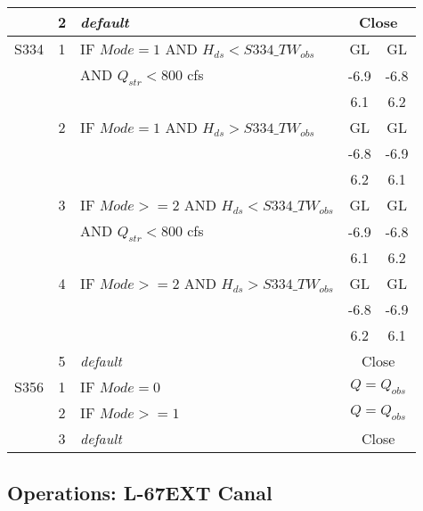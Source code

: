 \begin{table}[!h]
\begin{tabular}{|l|c|l|c|c|}
\hline
              &  2  & \it{default}                  & \multicolumn{2}{|c|}{Close}           \\
\hline
S334          &  1  & IF $Mode=1$  AND $H_{ds}<S334\_TW_{obs}$                 & GL    & GL   \\
              &     & AND $Q_{str}<800$ cfs    & -6.9  & -6.8 \\
              &     &         & 6.1   & 6.2  \\
\hline
              &  2  & IF $Mode=1$ AND $H_{ds}>S334\_TW_{obs}$                  & GL    & GL   \\
              &     &    & -6.8 & -6.9  \\
              &     &                               & 6.2  & 6.1   \\
\hline
              &  3  & IF $Mode>=2$ AND $H_{ds}<S334\_TW_{obs}$                   & GL    & GL   \\
              &     &  AND $Q_{str}<800$ cfs  & -6.9  & -6.8 \\
              &     &        & 6.1   & 6.2  \\
\hline
              &  4  & IF $Mode>=2$ AND $H_{ds}>S334\_TW_{obs}$                   & GL    & GL   \\
              &     &  & -6.8 & -6.9  \\
              &     &                               & 6.2  & 6.1   \\
\hline
              &  5  & \it{default}                  & \multicolumn{2}{|c|}{Close}   \\
\hline
\hline
S356          &  1  & IF $Mode=0$     & \multicolumn{2}{|c|}{$Q = Q_{obs}$}   \\
\hline
              &  2  & IF $Mode>=1$    & \multicolumn{2}{|c|}{$Q = Q_{obs}$}   \\
\hline
              &  3  & \it{default}    & \multicolumn{2}{|c|}{Close}           \\
\hline
\hline
\end{tabular}
\end{table}
\normalsize


\clearpage

\subsection{Operations: L-67EXT Canal}

